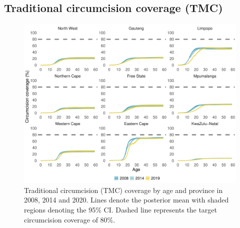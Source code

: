 \documentclass{article}
\begin{document}
\begin{appendix}

\subsection{Traditional circumcision coverage (TMC)}


\begin{figure}[H]
	\centering
	\includegraphics[width = \linewidth]{Figures/suppmat/Coverage/TMCcoverage_SingleAge_Province.pdf}
	\caption{Traditional circumcision (TMC) coverage by age and province in 2008, 2014 and 2020. Lines denote the posterior mean with shaded regions denoting the 95\% CI. Dashed line represents the target circumcision coverage of 80\%.}
\end{figure}	



\end{appendix}
\end{document}
